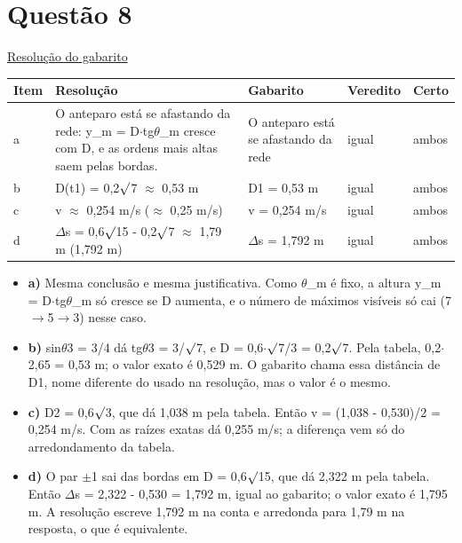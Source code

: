 \documentclass{article}%
\begin{document}
\section*{Questão 8}%
\href{https://poliedroresolve.sistemapoliedro.com.br/vestibulares/ime/2027/ime-2-fase-dia-2-27-10-2026-2-fase-dia-2/dissertativa-8-fisica-2-fase-dia-2-ime-2027}{Resolução do gabarito}\par\smallskip%
\begin{longtable}{@{}p{} p{} p{} p{} p{}@{}}\toprule Item & Resolução & Gabarito & Veredito & Certo \\ \midrule
a & O anteparo está se afastando da rede: y\_m = D$\cdot$tg$\theta$\_m cresce com D, e as ordens mais altas saem pelas bordas. & O anteparo está se afastando da rede & igual & ambos \\
b & D(t1) = 0,2$\surd$7 $\approx$ 0,53 m & D1 = 0,53 m & igual & ambos \\
c & v $\approx$ 0,254 m/s ($\approx$ 0,25 m/s) & v = 0,254 m/s & igual & ambos \\
d & $\Delta$s = 0,6$\surd$15 - 0,2$\surd$7 $\approx$ 1,79 m (1,792 m) & $\Delta$s = 1,792 m & igual & ambos \\
\bottomrule\end{longtable}%
\begin{itemize}%
\item%
\textbf{a)} Mesma conclusão e mesma justificativa. Como $\theta$\_m é fixo, a altura y\_m = D$\cdot$tg$\theta$\_m só cresce se D aumenta, e o número de máximos visíveis só cai (7$\to$5$\to$3) nesse caso.%
\item%
\textbf{b)} sin$\theta$3 = 3/4 dá tg$\theta$3 = 3/$\surd$7, e D = 0,6$\cdot$$\surd$7/3 = 0,2$\surd$7. Pela tabela, 0,2$\cdot$2,65 = 0,53 m; o valor exato é 0,529 m. O gabarito chama essa distância de D1, nome diferente do usado na resolução, mas o valor é o mesmo.%
\item%
\textbf{c)} D2 = 0,6$\surd$3, que dá 1,038 m pela tabela. Então v = (1,038 - 0,530)/2 = 0,254 m/s. Com as raízes exatas dá 0,255 m/s; a diferença vem só do arredondamento da tabela.%
\item%
\textbf{d)} O par $\pm$1 sai das bordas em D = 0,6$\surd$15, que dá 2,322 m pela tabela. Então $\Delta$s = 2,322 - 0,530 = 1,792 m, igual ao gabarito; o valor exato é 1,795 m. A resolução escreve 1,792 m na conta e arredonda para 1,79 m na resposta, o que é equivalente.%
\end{itemize}%
\end{document}
